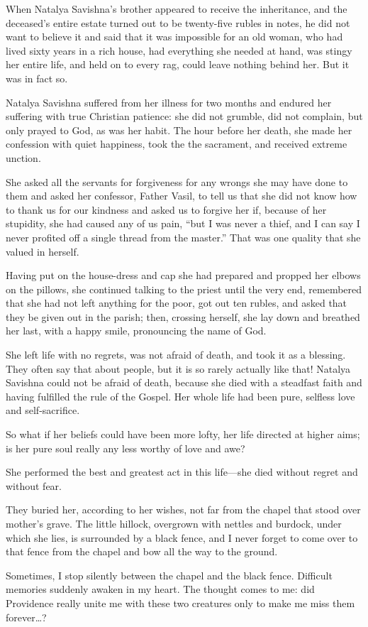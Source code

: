 When Natalya Savishna's brother appeared to receive the inheritance, and the deceased's entire estate turned out to be twenty-five rubles in notes, he did not want to believe it and said that it was impossible for an old woman, who had lived sixty years in a rich house, had everything she needed at hand, was stingy her entire life, and held on to every rag, could leave nothing behind her. But it was in fact so.

Natalya Savishna suffered from her illness for two months and endured her suffering with true Christian patience: she did not grumble, did not complain, but only prayed to God, as was her habit. The hour before her death, she made her confession with quiet happiness, took the the sacrament, and received extreme unction.

She asked all the servants for forgiveness for any wrongs she may have done to them and asked her confessor, Father Vasil, to tell us that she did not know how to thank us for our kindness and asked us to forgive her if, because of her stupidity, she had caused any of us pain, ``but I was never a thief, and I can say I never profited off a single thread from the master.'' That was one quality that she valued in herself.

Having put on the house-dress and cap she had prepared and propped her elbows on the pillows, she continued talking to the priest until the very end, remembered that she had not left anything for the poor, got out ten rubles, and asked that they be given out in the parish; then, crossing herself, she lay down and breathed her last, with a happy smile, pronouncing the name of God.

She left life with no regrets, was not afraid of death, and took it as a blessing. They often say that about people, but it is so rarely actually like that! Natalya Savishna could not be afraid of death, because she died with a steadfast faith and having fulfilled the rule of the Gospel. Her whole life had been pure, selfless love and self-sacrifice.

So what if her beliefs could have been more lofty, her life directed at higher aims; is her pure soul really any less worthy of love and awe?

She performed the best and greatest act in this life---she died without regret and without fear.

They buried her, according to her wishes, not far from the chapel that stood over mother's grave. The little hillock, overgrown with nettles and burdock, under which she lies, is surrounded by a black fence, and I never forget to come over to that fence from the chapel and bow all the way to the ground.

Sometimes, I stop silently between the chapel and the black fence. Difficult memories suddenly awaken in my heart. The thought comes to me: did Providence really unite me with these two creatures only to make me miss them forever\ldots{}?
